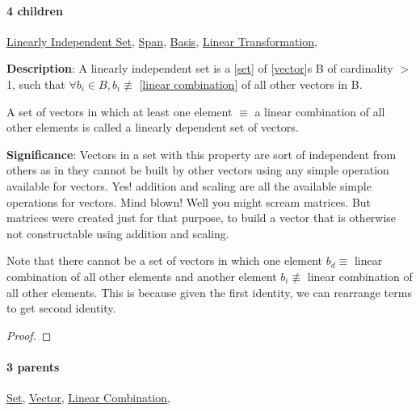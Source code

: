 \documentclass[../main.tex]{subfiles}
\begin{document}
\paragraph{4 children} \hyperref[statement:Linearly Independent Set]{Linearly Independent Set}, \hyperref[statement:Span]{Span}, \hyperref[statement:Basis]{Basis}, \hyperref[statement:Linear Transformation]{Linear Transformation}, 



\begin{statement}
\label{statement:Linearly Independent Set}\hspace*{0pt}\par
\end{statement}
\textbf{Description}:
A linearly independent set is a [\hyperref[statement:Set]{set}] of [\hyperref[statement:Vector]{vector}]s B of cardinality $>$ 1, such that $ \forall b_i \in B, b_i \not\equiv $ [\hyperref[statement:Linear Combination]{linear combination}] of all other vectors in B.

A set of vectors in which at least one element $ \equiv $ a linear combination of all other elements is called a linearly dependent set of vectors.
\par
{\color{magenta} \textbf{Significance}:
Vectors in a set with this property are sort of independent from others as in they cannot be built by other vectors using any simple operation available for vectors.
Yes! addition and scaling are all the available simple operations for vectors. Mind blown!
Well you might scream matrices. But matrices were created just for that purpose, to build a vector that is otherwise not constructable using addition and scaling.

Note that there cannot be a set of vectors in which one element $ b_d \equiv $ linear combination of all other elements and another element $ b_i \not\equiv $ linear combination of all other elements.
This is because given the first identity, we can rearrange terms to get second identity.
\par}
\begin{proof}
\proofbydefinition
\end{proof}\par
\paragraph{3 parents} \hyperref[statement:Set]{Set}, \hyperref[statement:Vector]{Vector}, \hyperref[statement:Linear Combination]{Linear Combination}, 
\end{document}
